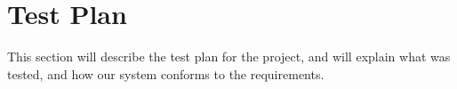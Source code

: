\section{Test Plan}
This section will describe the test plan for the project, and will explain what was tested, and how our system conforms to the requirements.